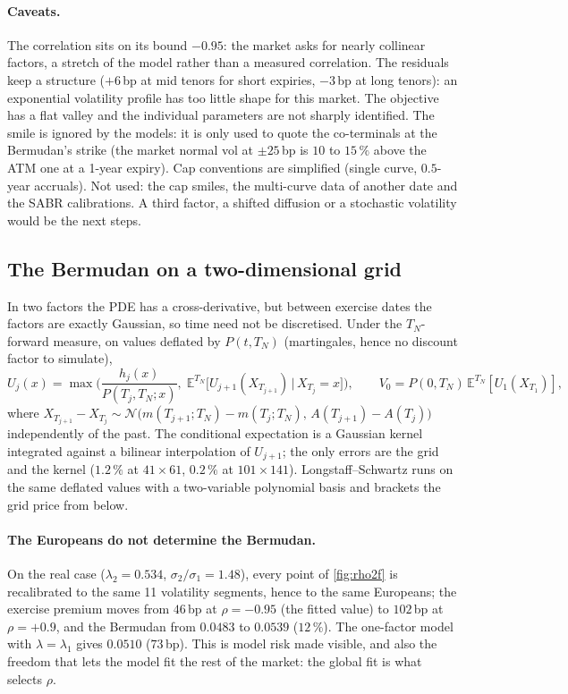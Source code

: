 \documentclass[11pt,a4paper]{article}
\theoremstyle{definition}
\theoremstyle{remark}
\newcommand{\E}{\mathbb{E}}
\newcommand{\N}{\mathcal{N}}
\begin{document}
\paragraph{Caveats.} The correlation sits on its bound $-0.95$: the market asks for nearly collinear factors, a stretch of the model rather than a
measured correlation. The residuals keep a structure ($+6\,$bp at mid tenors for short expiries, $-3\,$bp at long tenors): an exponential volatility
profile has too little shape for this market. The objective has a flat valley and the individual parameters are not sharply identified. The smile is
ignored by the models: it is only used to quote the co-terminals at the Bermudan's strike (the market normal vol at $\pm25\,$bp is $10$ to $15\,\%$ above
the ATM one at a 1-year expiry). Cap conventions are simplified (single curve, $0.5$-year accruals). Not used: the cap smiles, the multi-curve data of another
date and the SABR calibrations. A third factor, a shifted diffusion or a stochastic volatility would be the next steps.

\subsection{The Bermudan on a two-dimensional grid}
In two factors the PDE has a cross-derivative, but between exercise dates the factors are exactly Gaussian, so time need not be discretised.
Under the $T_N$-forward measure, on values deflated by $P(t,T_N)$ (martingales, hence no discount factor to simulate),
\[
U_j(x)=\max\Big(\frac{h_j(x)}{P(T_j,T_N;x)},\;\E^{T_N}\big[U_{j+1}(X_{T_{j+1}})\,\big|\,X_{T_j}=x\big]\Big),\qquad V_0=P(0,T_N)\,\E^{T_N}[U_1(X_{T_1})],
\]
where $X_{T_{j+1}}-X_{T_j}\sim\N\big(m(T_{j+1};T_N)-m(T_j;T_N),\,A(T_{j+1})-A(T_j)\big)$ independently of the past. The conditional expectation is a
Gaussian kernel integrated against a bilinear interpolation of $U_{j+1}$; the only errors are the grid and the kernel ($1.2\,\%$ at $41\times61$, $0.2\,\%$ at
$101\times141$). Longstaff--Schwartz runs on the same deflated values with a two-variable polynomial basis and brackets the grid price from below.

\paragraph{The Europeans do not determine the Bermudan.} On the real case ($\lambda_2=0.534$, $\sigma_2/\sigma_1=1.48$), every point of \cref{fig:rho2f} is
recalibrated to the same 11 volatility segments, hence to the same Europeans; the exercise premium moves from $46\,$bp at $\rho=-0.95$ (the fitted value) to
$102\,$bp at $\rho=+0.9$, and the Bermudan from $0.0483$ to $0.0539$ ($12\,\%$). The one-factor model with $\lambda=\lambda_1$ gives $0.0510$ ($73\,$bp).
This is model risk made visible, and also the freedom that lets the model fit the rest of the market: the global fit is what selects $\rho$.
\end{document}
